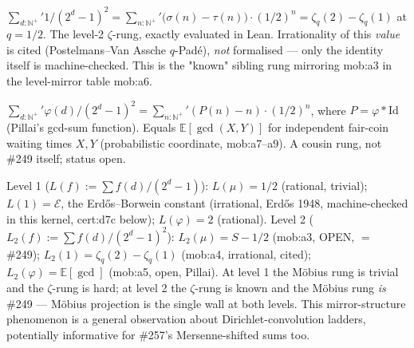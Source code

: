 \begin{prop}
$\sum_{d:\mathbb{N}^+}' 1/(2^d-1)^2 = \sum_{n:\mathbb{N}^+}' \big(\sigma(n)-\tau(n)\big)\cdot(1/2)^n = \zeta_q(2) - \zeta_q(1)$ at $q=1/2$. The level-2 $\zeta$-rung, exactly evaluated in Lean. Irrationality of this \emph{value} is cited (Postelmans--Van Assche $q$-Pad\'e), \emph{not} formalised — only the identity itself is machine-checked. This is the "known" sibling rung mirroring mob:a3 in the level-mirror table mob:a6.
\par\noindent{}   
\end{prop}

\begin{prop}
$\sum_{d:\mathbb{N}^+}' \varphi(d)/(2^d-1)^2 = \sum_{n:\mathbb{N}^+}' (P(n)-n)\cdot(1/2)^n$, where $P = \varphi * \mathrm{Id}$ (Pillai's gcd-sum function). Equals $\mathbb{E}[\gcd(X,Y)]$ for independent fair-coin waiting times $X,Y$ (probabilistic coordinate, mob:a7--a9). A cousin rung, not \#249 itself; status open.
\par\noindent{}   
\end{prop}

\begin{obs}
Level 1 ($L(f) := \sum f(d)/(2^d-1)$): $L(\mu) = 1/2$ (rational, trivial); $L(1) = \mathcal{E}$, the Erd\H{o}s--Borwein constant (irrational, Erd\H{o}s 1948, machine-checked in this kernel, cert:d7c below); $L(\varphi) = 2$ (rational). Level 2 ($L_2(f) := \sum f(d)/(2^d-1)^2$): $L_2(\mu) = S - 1/2$ (mob:a3, OPEN, $=$ \#249); $L_2(1) = \zeta_q(2)-\zeta_q(1)$ (mob:a4, irrational, cited); $L_2(\varphi) = \mathbb{E}[\gcd]$ (mob:a5, open, Pillai). At level 1 the M\"obius rung is trivial and the $\zeta$-rung is hard; at level 2 the $\zeta$-rung is known and the M\"obius rung \emph{is} \#249 — M\"obius projection is the single wall at both levels. This mirror-structure phenomenon is a general observation about Dirichlet-convolution ladders, potentially informative for \#257's Mersenne-shifted sums too.
\par\noindent{}  
\end{obs}

